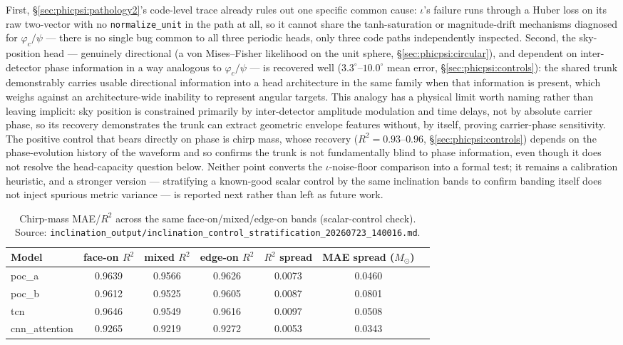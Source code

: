 \documentclass[11pt]{article}
\begin{document}
First, \S\ref{sec:phicpsi:pathology2}'s code-level trace already rules out one specific common cause: $\iota$'s failure runs through a Huber loss on its raw two-vector with no \texttt{normalize\_unit} in the path at all, so it cannot share the tanh-saturation or magnitude-drift mechanisms diagnosed for $\varphi_c/\psi$ --- there is no single bug common to all three periodic heads, only three code paths independently inspected.
Second, the sky-position head --- genuinely directional (a von Mises--Fisher likelihood on the unit sphere, \S\ref{sec:phicpsi:circular}), and dependent on inter-detector phase information in a way analogous to $\varphi_c/\psi$ --- is recovered well ($3.3^\circ$--$10.0^\circ$ mean error, \S\ref{sec:phicpsi:controls}): the shared trunk demonstrably carries usable directional information into a head architecture in the same family when that information is present, which weighs against an architecture-wide inability to represent angular targets.
This analogy has a physical limit worth naming rather than leaving implicit: sky position is constrained primarily by inter-detector amplitude modulation and time delays, not by absolute carrier phase, so its recovery demonstrates the trunk can extract geometric envelope features without, by itself, proving carrier-phase sensitivity.
The positive control that bears directly on phase is chirp mass, whose recovery ($R^2 = 0.93$--$0.96$, \S\ref{sec:phicpsi:controls}) depends on the phase-evolution history of the waveform and so confirms the trunk is not fundamentally blind to phase information, even though it does not resolve the head-capacity question below.
Neither point converts the $\iota$-noise-floor comparison into a formal test; it remains a calibration heuristic, and a stronger version --- stratifying a known-good scalar control by the same inclination bands to confirm banding itself does not inject spurious metric variance --- is reported next rather than left as future work.

\begin{table}[tbp]
    \centering
    \caption{Chirp-mass MAE/$R^2$ across the same face-on/mixed/edge-on bands (scalar-control check).
    Source: \texttt{inclination\_output/inclination\_control\_stratification\_20260723\_140016.md}.}
    \label{tab:phicpsi:controlstrat}
    \small
    \begin{tabular}{@{}lcccccc@{}}
        \toprule
        Model & face-on $R^2$ & mixed $R^2$ & edge-on $R^2$ & $R^2$ spread & MAE spread ($M_\odot$) \\
        \midrule
        poc\_a         & 0.9639 & 0.9566 & 0.9626 & 0.0073 & 0.0460 \\
        poc\_b         & 0.9612 & 0.9525 & 0.9605 & 0.0087 & 0.0801 \\
        tcn            & 0.9646 & 0.9549 & 0.9616 & 0.0097 & 0.0508 \\
        cnn\_attention & 0.9265 & 0.9219 & 0.9272 & 0.0053 & 0.0343 \\
        \bottomrule
    \end{tabular}
\end{table}
\end{document}
